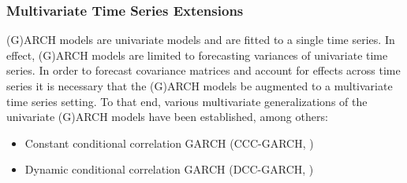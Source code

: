 \documentclass[xcolor=dvipsnames, english, 8pt]{beamer}
\begin{document}
\begin{frame}
    \frametitle{Multivariate Time Series Extensions}
    (G)ARCH models are univariate models and are fitted to a single time series. In effect, (G)ARCH models are limited to forecasting variances of univariate time series. In order to forecast covariance matrices and account for effects across time series it is necessary that the (G)ARCH models be augmented to a multivariate time series setting. To that end, various multivariate generalizations of the univariate (G)ARCH models have been established, among others:\vspace{0.25cm}\\
    \begin{itemize}
        \item Constant conditional correlation GARCH (CCC-GARCH, \cite{Bollerslev1990})
        \item Dynamic conditional correlation GARCH (DCC-GARCH, \cite{Engle2002})
    \end{itemize}

\end{frame}
\end{document}
